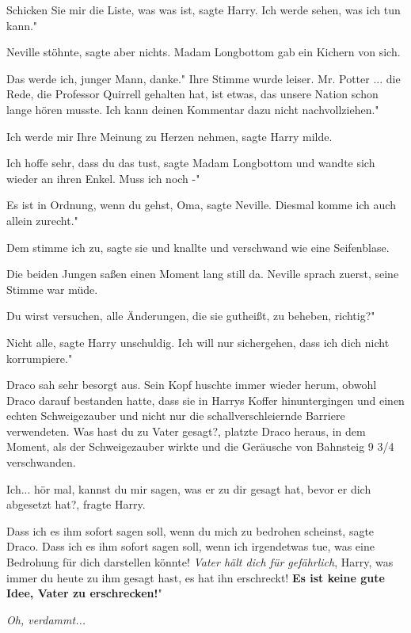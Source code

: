 \glqq Schicken Sie mir die Liste, was was ist\grqq{}, sagte Harry. \glqq Ich
werde sehen, was ich tun kann."

Neville stöhnte, sagte aber nichts. Madam Longbottom gab ein Kichern von sich.

\glqq Das werde ich, junger Mann, danke." Ihre Stimme wurde leiser. \glqq Mr.
Potter ... die Rede, die Professor Quirrell gehalten hat, ist etwas, das unsere
Nation schon lange hören musste. Ich kann deinen Kommentar dazu nicht
nachvollziehen."

\glqq Ich werde mir Ihre Meinung zu Herzen nehmen\grqq{}, sagte Harry milde.

\glqq Ich hoffe sehr, dass du das tust\grqq{}, sagte Madam Longbottom und wandte
sich wieder an ihren Enkel. \glqq Muss ich noch -"

\glqq Es ist in Ordnung, wenn du gehst, Oma\grqq{}, sagte Neville. \glqq Diesmal
komme ich auch allein zurecht."

\glqq Dem stimme ich zu\grqq{}, sagte sie und knallte und verschwand wie eine
Seifenblase.

Die beiden Jungen saßen einen Moment lang still da. Neville sprach zuerst, seine
Stimme war müde.

\glqq Du wirst versuchen, alle Änderungen, die sie gutheißt, zu beheben,
richtig?"

\glqq Nicht alle\grqq{}, sagte Harry unschuldig. \glqq Ich will nur sichergehen,
dass ich dich nicht korrumpiere."


Draco sah sehr besorgt aus. Sein Kopf huschte immer wieder herum, obwohl Draco
darauf bestanden hatte, dass sie in Harrys Koffer hinuntergingen und einen
echten Schweigezauber und nicht nur die schallverschleiernde Barriere
verwendeten. \glqq Was hast du zu Vater gesagt?\grqq{}, platzte Draco heraus, in
dem Moment, als der Schweigezauber wirkte und die Geräusche von Bahnsteig 9 3/4
verschwanden.

\glqq Ich... hör mal, kannst du mir sagen, was er zu dir gesagt hat, bevor er
dich abgesetzt hat?\grqq{}, fragte Harry.

\glqq Dass ich es ihm sofort sagen soll, wenn du mich zu bedrohen
scheinst\grqq{}, sagte Draco. \glqq Dass ich es ihm sofort sagen soll, wenn ich
irgendetwas tue, was eine Bedrohung für dich darstellen könnte! \emph{Vater hält
dich für gefährlich}, Harry, was immer du heute zu ihm gesagt hast, es hat ihn
erschreckt! \textbf{Es ist keine gute Idee, Vater zu erschrecken!}"

\emph{Oh, verdammt...}

